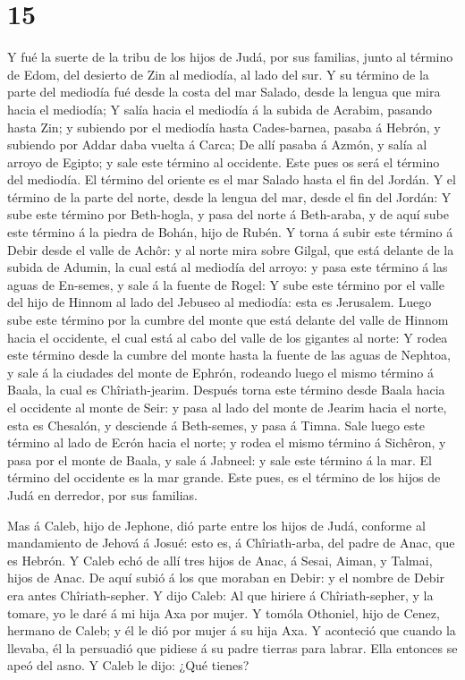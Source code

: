 \hypertarget{section-14}{%
\section{15}\label{section-14}}

 Y fué la suerte de la tribu de los hijos de Judá, por sus
familias, junto al término de Edom, del desierto de Zin al mediodía, al
lado del sur.  Y su término de la parte del mediodía fué
desde la costa del mar Salado, desde la lengua que mira hacia el
mediodía;  Y salía hacia el mediodía á la subida de Acrabim,
pasando hasta Zin; y subiendo por el mediodía hasta Cades-barnea, pasaba
á Hebrón, y subiendo por Addar daba vuelta á Carca;  De allí
pasaba á Azmón, y salía al arroyo de Egipto; y sale este término al
occidente. Este pues os será el término del mediodía.  El
término del oriente es el mar Salado hasta el fin del Jordán. Y el
término de la parte del norte, desde la lengua del mar, desde el fin del
Jordán:  Y sube este término por Beth-hogla, y pasa del
norte á Beth-araba, y de aquí sube este término á la piedra de Bohán,
hijo de Rubén.  Y torna á subir este término á Debir desde
el valle de Achôr: y al norte mira sobre Gilgal, que está delante de la
subida de Adumin, la cual está al mediodía del arroyo: y pasa este
término á las aguas de En-semes, y sale á la fuente de Rogel:
 Y sube este término por el valle del hijo de Hinnom al lado
del Jebuseo al mediodía: esta es Jerusalem. Luego sube este término por
la cumbre del monte que está delante del valle de Hinnom hacia el
occidente, el cual está al cabo del valle de los gigantes al norte:
 Y rodea este término desde la cumbre del monte hasta la
fuente de las aguas de Nephtoa, y sale á la ciudades del monte de
Ephrón, rodeando luego el mismo término á Baala, la cual es
Chîriath-jearim.  Después torna este término desde Baala
hacia el occidente al monte de Seir: y pasa al lado del monte de Jearim
hacia el norte, esta es Chesalón, y desciende á Beth-semes, y pasa á
Timna.  Sale luego este término al lado de Ecrón hacia el
norte; y rodea el mismo término á Sichêron, y pasa por el monte de
Baala, y sale á Jabneel: y sale este término á la mar.  El
término del occidente es la mar grande. Este pues, es el término de los
hijos de Judá en derredor, por sus familias.

 Mas á Caleb, hijo de Jephone, dió parte entre los hijos de
Judá, conforme al mandamiento de Jehová á Josué: esto es, á
Chîriath-arba, del padre de Anac, que es Hebrón.  Y Caleb
echó de allí tres hijos de Anac, á Sesai, Aiman, y Talmai, hijos de
Anac.  De aquí subió á los que moraban en Debir: y el
nombre de Debir era antes Chîriath-sepher.  Y dijo Caleb:
Al que hiriere á Chîriath-sepher, y la tomare, yo le daré á mi hija Axa
por mujer.  Y tomóla Othoniel, hijo de Cenez, hermano de
Caleb; y él le dió por mujer á su hija Axa.  Y aconteció
que cuando la llevaba, él la persuadió que pidiese á su padre tierras
para labrar. Ella entonces se apeó del asno. Y Caleb le dijo: ¿Qué
tienes?

